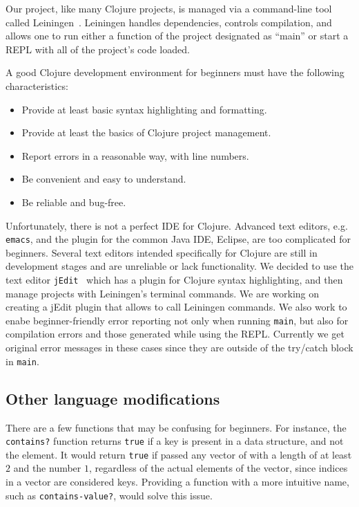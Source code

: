 \documentclass[submission,copyright,creativecommons]{eptcs}
\newcommand{\allcomments}[1]{{#1}}
\newcommand{\elenacomment}[1]{{\bf \textcolor{ForestGreen}{\allcomments{{#1}}}}}
\newcommand{\stephencomment}[1]{{\bf \color{StephensBlue}{\allcomments{{#1}}}}} %
\begin{document}
Our project, like many Clojure projects, is managed via a command-line tool called Leiningen~\cite{lein}. Leiningen handles dependencies, controls compilation, and allows one to run either a function of the project designated as ``main'' or start a REPL with all of the project's code loaded. 

A good Clojure development environment for beginners %
 must have the following characteristics: 
\begin{itemize}
\item Provide at least basic syntax highlighting and formatting. 
\item Provide at least the basics of Clojure project management. 
\item Report errors in a reasonable way, with line numbers. 
\item Be convenient and easy to understand. 
\item Be reliable and bug-free.
\end{itemize}
Unfortunately, there is not a perfect IDE for Clojure. 
Advanced text editors, e.g. {\tt emacs}, and the plugin for the common Java IDE, Eclipse, are too complicated for beginners. Several text editors intended specifically for Clojure are still in development stages and are unreliable or lack functionality. We decided to use the text editor {\tt jEdit}~\cite{jedit} which has a plugin for Clojure syntax highlighting, and then manage projects with Leiningen's terminal commands.  We are working on creating a jEdit plugin that allows to call Leiningen commands. We also work to enabe beginner-friendly error reporting not only when running {\tt main}, but also for compilation errors and those generated while using the REPL. Currently we get original error messages in these  cases since they are outside of the try/catch block in {\tt main}. 

\subsection{Other language modifications}\label{subsec:other}
There are a few functions that may be confusing
 for beginners. For instance, the {\tt contains?} function returns {\tt true} if a key is present in a data structure, and not the element. It would return {\tt true} if passed any vector of with a length of at least $2$ and the number $1$, regardless of the actual elements of the vector, since indices in a vector are considered keys. Providing a function with a more intuitive name, such as {\tt contains-value?}, would solve this issue. %
\end{document}
